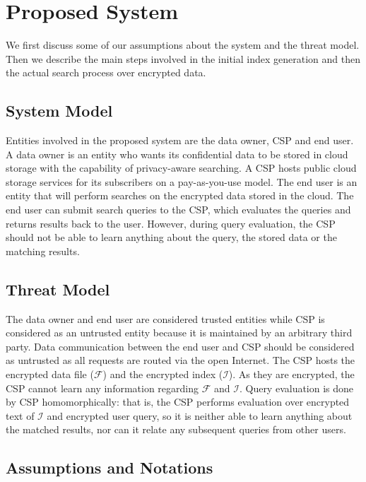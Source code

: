 \section{Proposed System}
\label{sec:system}





We first discuss some of our assumptions
about the system and the threat model. Then we describe the main
steps involved in the initial index generation
and then the actual search process over encrypted data.

\subsection{System Model}

Entities involved in the proposed system are the data owner, CSP and end user.
A data owner is an entity who wants its confidential data to be stored in cloud storage with the capability of privacy-aware searching. 
A CSP hosts public cloud storage services for its subscribers on 
a pay-as-you-use model. The end user is an entity that will perform searches on the 
encrypted data stored in the cloud. The end user can submit search queries 
to the CSP, which evaluates the queries and returns results back to the user. 
However, during query evaluation, the CSP should not be able to learn anything about the query, 
the stored data or the matching results.

\subsection{Threat Model}

The data owner and end user are considered trusted entities while CSP 
is considered as an untrusted entity because it is maintained by an 
arbitrary third party. Data communication between the end user and CSP should 
be considered as untrusted as all requests are routed via the open Internet. 
The CSP hosts the encrypted data file ($\mathcal{F}$) and the encrypted index ($\mathcal{I}$). 
As they are encrypted, the CSP cannot learn any information regarding $\mathcal{F}$ and $\mathcal{I}$. 
Query evaluation is done by CSP homomorphically: that is, the CSP performs 
evaluation over encrypted text of $\mathcal{I}$ and encrypted user query, 
so it is neither able to learn anything about the matched results, nor
can it relate any subsequent queries from other users. 

\subsection{Assumptions and Notations}

